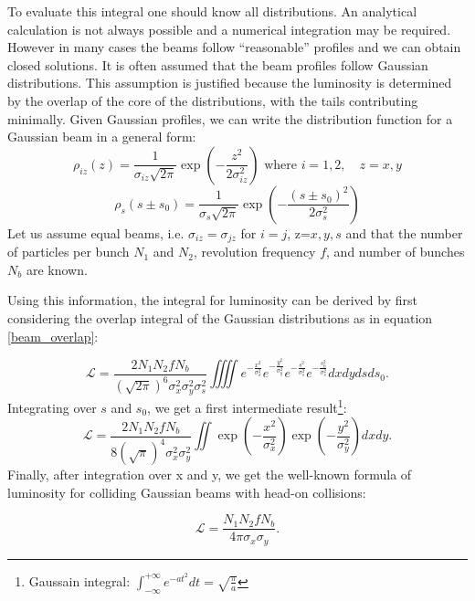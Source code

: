 To evaluate this integral one should know all distributions. An analytical calculation is not always possible and a numerical integration may be required. However in many cases the beams follow ``reasonable” profiles and we can obtain closed solutions. It is often assumed that the beam profiles follow Gaussian distributions. This assumption is justified because the luminosity is determined by the overlap of the core of the distributions, with the tails contributing minimally.
Given Gaussian profiles, we can write the distribution function for a Gaussian beam in a general form:
\begin{equation}
\rho_{iz}(z) =\frac{1}{\sigma_{iz}\sqrt{2\pi}} \exp\left( -\frac{z^2}{2 \sigma_{iz}^2} \right) \text{ where } i=1,2, \quad z=x,y
\end{equation}
\begin{equation}
\rho_{s}(s\pm s_0) =\frac{1}{\sigma_s\sqrt{2\pi}} \exp\left( -\frac{(s\pm s_0)^2}{2 \sigma_s^2} \right)
\end{equation}
Let us assume equal beams, i.e.  $\sigma_{iz} = \sigma_{jz}$ for $i=j$, z=$x,y,s$ and that the number of particles per bunch $N_1$ and $N_2$, revolution frequency $f$, and number of bunches $N_b$ are known. 

Using this information, the integral for luminosity can be derived by first considering the overlap integral of the Gaussian distributions as in equation \eqref{beam_overlap}:

\begin{equation}
\mathcal{L} = \frac{2  N_1 N_2 f N_b}{(\sqrt{2\pi})^6 \sigma_x^2\sigma_y^2\sigma_s^2}\iiiint e^{-\frac{x^2}{ \sigma_x^2}} e^{-\frac{y^2}{\sigma_y^2}} e^{-\frac{s^2}{\sigma_s^2}}e^{-\frac{s_0^2}{\sigma_s^2}}dxdydsds_0.
\end{equation}
Integrating over $s$ and $s_0$, we get a first intermediate result\footnote{Gaussain integral: $\int_{-\infty}^{+\infty}e^{-at^2}dt = \sqrt{\tfrac{\pi}{a}}$}:
\begin{equation}
    \mathcal{L} = \frac{2  N_1 N_2 f N_b}{8(\sqrt{\pi})^4 \sigma_x^2\sigma_y^2}\iint \exp\left(-\frac{x^2}{\sigma_x^2}\right) \exp\left(-\frac{y^2}{\sigma_y^2}\right) dxdy .\label{spec_lumi_gaus}
\end{equation}
Finally, after integration over x and y, we get the well-known formula of luminosity for colliding Gaussian beams with head-on collisions:

\begin{equation}
\mathcal{L} = \frac{N_1  N_2  f N_b}{4 \pi  \sigma_x \sigma_y}.
\end{equation}

